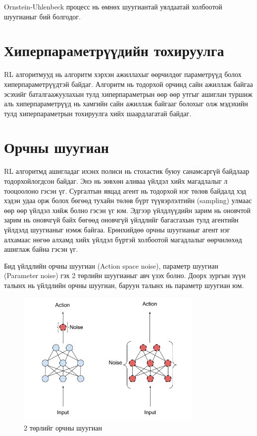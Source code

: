 \documentclass[12pt,A4]{report}
\begin{document}
Ornstein-Uhlenbeck процесс нь өмнөх шуугиантай уялдаатай холбоотой шуугианыг бий болгодог.

\section{Хиперпараметрүүдийн тохируулга}

RL алгоритмууд нь алгоритм хэрхэн ажиллахыг өөрчилдөг параметрүүд болох хиперпараметрүүдтэй байдаг. Алгоритм нь тодорхой орчинд сайн ажиллаж байгаа эсэхийг баталгаажуулахын тулд хиперпараметрын өөр өөр утгыг ашиглан туршиж аль хиперпараметрүүд нь хамгийн сайн ажиллаж байгааг болохыг олж мэдэхийн тулд хиперпараметрын тохируулга хийх шаардлагатай байдаг.

\section{Орчны шуугиан}

RL алгоритмд ашигладаг ихэнх полиси нь стохастик буюу санамсаргүй байдлаар тодорхойлогдсон байдаг. Энэ нь зөвхөн аливаа үйлдэл хийх магадлалыг л тооцоолоно гэсэн үг. Сургалтын явцад агент нь тодорхой нэг төлөв байдалд хэд хэдэн удаа орж болох бөгөөд тухайн төлөв бүрт түүвэрлэлтийн (sampling) улмаас өөр өөр үйлдэл хийж болно гэсэн үг юм. Эдгээр үйлдлүүдийн зарим нь оновчтой зарим нь оновчгүй байх бөгөөд оновчгүй үйлдлийг багасгахын тулд агентийн үйлдэлд шуугианыг нэмж байгаа. Ерөнхийдөө орчны шуугианыг агент нэг алхамаас нөгөө алхамд хийх үйлдэл бүртэй холбоотой магадлалыг өөрчилөхөд ашиглаж байна гэсэн үг.

Бид үйлдлийн орчны шуугиан (Action space noise), параметр шуугиан (Parameter noise) гэх 2 төрлийн шуугианыг авч үзэх болно. Доорх зургын зүүн талынх нь үйлдлийн орчны шуугиан, баруун талынх нь параметр шуугиан юм.

\begin{figure}[H]
\centering
\includegraphics[width=0.8\textwidth]{./images/p_diag_1}
\caption{2 төрлийг орчны шуугиан}
\end{figure}
\end{document}
